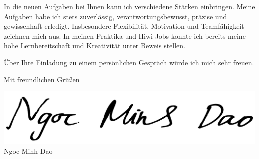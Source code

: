 \documentclass[11pt,a4paper]{article}
\begin{document}
In die neuen Aufgaben bei Ihnen kann ich verschiedene Stärken einbringen.
Meine Aufgaben habe ich stets zuverlässig, verantwortungsbewusst, präzise und gewissenhaft erledigt.
Insbesondere Flexibilität, Motivation und Teamfähigkeit zeichnen mich aus.
In meinen Praktika und Hiwi-Jobs konnte ich bereits meine hohe Lernbereitschaft und Kreativität unter Beweis stellen.

Über Ihre Einladung zu einem persönlichen Gespräch würde ich mich sehr freuen.

\vspace{1em}

Mit freundlichen Grüßen

\includegraphics[scale=0.2]{./signaturen/NgocMinhDao-Signatur.pdf}\\
Ngoc Minh Dao
\end{document}

